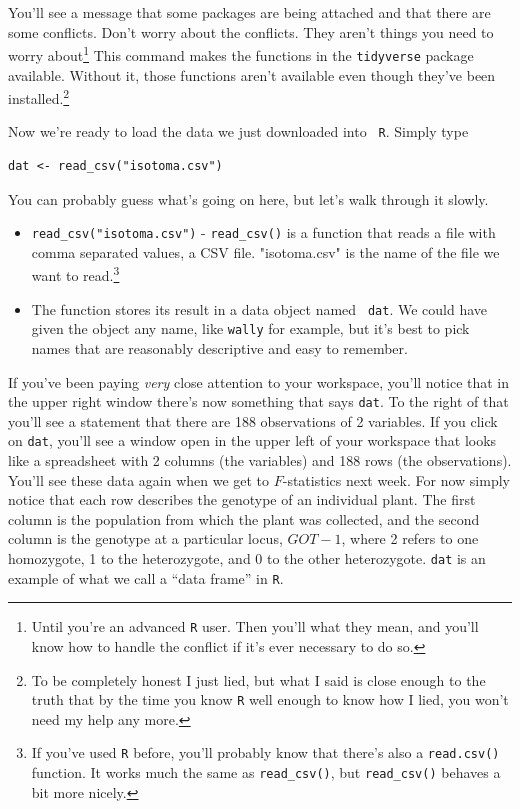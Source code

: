 \documentclass[12pt]{article}
\begin{document}
\noindent You'll see a message that some packages are being attached
and that there are some conflicts. Don't worry about the
conflicts. They aren't things you need to worry about\footnote{Until you're an
advanced {\tt R} user. Then you'll what they mean, and you'll know how
to handle the conflict if it's ever necessary to do so.} This command
makes the functions in the {\tt tidyverse} package available. Without
it, those functions aren't available even though they've been
installed.\footnote{To be completely honest I just lied, but what I
  said is close enough to the truth that by the time you know {\tt R}
  well enough to know how I lied, you won't need my help any more.}

Now we're ready to load the data we just downloaded into {\tt
  R}. Simply type

\begin{verbatim}
dat <- read_csv("isotoma.csv")
\end{verbatim}

\noindent You can probably guess what's going on here, but let's walk
through it slowly.

\begin{itemize}

\item {\tt read\_csv("isotoma.csv")} - {\tt read\_csv()} is a function
  that reads a file with comma separated values, a CSV
  file. "isotoma.csv" is the name of the file we want to
  read.\footnote{If you've used {\tt R} before, you'll probably know
    that there's also a {\tt read.csv()} function. It works much the
    same as {\tt read\_csv()}, but {\tt read\_csv()} behaves a bit more
    nicely.}

\item The function stores its result in a data object named {\tt
    dat}. We could have given the object any name, like {\tt wally}
  for example, but it's best to pick names that are reasonably
  descriptive and easy to remember.

\end{itemize}

\noindent If you've been paying {\it very\/} close attention to your
workspace, you'll notice that in the upper right window there's now
something that says {\tt dat}. To the right of that you'll see a
statement that there are 188 observations of 2 variables. If you click
on {\tt dat}, you'll see a window open in the upper left of your
workspace that looks like a spreadsheet with 2 columns (the variables)
and 188 rows (the observations). You'll see these data again when we
get to $F$-statistics next week. For now simply notice that each row
describes the genotype of an individual plant. The first column is the
population from which the plant was collected, and the second column
is the genotype at a particular locus, $GOT-1$, where 2 refers to one
homozygote, 1 to the heterozygote, and 0 to the other
heterozygote. {\tt dat} is an example of what we call a ``data
frame'' in {\tt R}.
\end{document}
